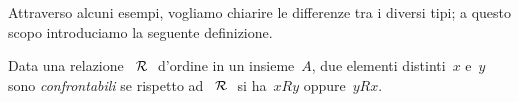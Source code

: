 Attraverso alcuni esempi, vogliamo chiarire le differenze tra i diversi tipi; a 
questo scopo introduciamo la seguente definizione.

\begin{definizione}
Data una relazione~\(~\mathcal{R}~\) d'ordine in un insieme~\(A\), due elementi 
distinti~\(x\) 
e~\(y\) sono \emph{confrontabili} se rispetto ad~\(~\mathcal{R}~\) si ha~\(x R y\) 
oppure~\(y R 
x\).
\end{definizione}

\begin{comment}
 
 \begin{esempio}

In base al diagramma di Eulero-Venn nella figura~\ref{fig:B.5} introduciamo 
nell'insieme di insiemi~\(S = \lbrace U, A, B, C, D, E, F \rbrace\) la 
relazione~\(\srel\): ``essere sottoinsieme di''.

Ricordiamo che, dati due insiemi~\(X\) e~\(Y\), \(X\) è \emph{sottoinsieme} 
di~\(Y\) 
quando ogni elemento di~\(X\) appartiene a~\(Y\) in simboli~\(X \subseteq Y\) e
si legge~\(X\) è contenuto in~\(Y\) o~\(X\) è uguale a~\(Y\).

Vogliamo studiare le proprietà della relazione~\(\srel\):

\begin{enumeratea}
\item poiché ogni insieme è sottoinsieme di se stesso, possiamo dire 
che~\(\srel\) 
è riflessiva;
\item se~\(X \subseteq Y\) e~\(X \neq Y\) allora~\(Y \not\subset X\) 
quindi~\(\srel\) è 
una relazione antisimmetrica;
\item se~\(X \subseteq Y\) e~\(Y \subseteq Z\) allora~\(X \subseteq Z\) 
quindi~\(\srel\) 
è una relazione transitiva.
\end{enumeratea}

Inoltre è evidente che esistono almeno due elementi dell'insieme~\(S\) che non 
sono in
alcun modo in relazione: ad esempio~\(A \not\subset D\) e~\(D \not\subset A\), 
ossia~\(A\) e~\(D\) non sono confrontabili.

 \end{esempio}

 \begin{esempio}

Riprendiamo il diagramma di Eulero-Venn dell'esempio precedente e introduciamo 
nell'insieme~\(S = \lbrace U, A, B, C, D, E, F \rbrace\) la relazione~\(\srel\):
``essere sottoinsieme proprio di''. Studiamo le proprietà di questa relazione:
\begin{itemize*}
 \item cosa è cambiato rispetto alla relazione precedente? \(\ldots\)
 \item sono ancora valide le proprietà antisimmetrica e transitiva? \(\ldots\)
 \item esistono elementi di~\(S\) non confrontabili? \(\ldots\)
\end{itemize*}


\end{comment}
